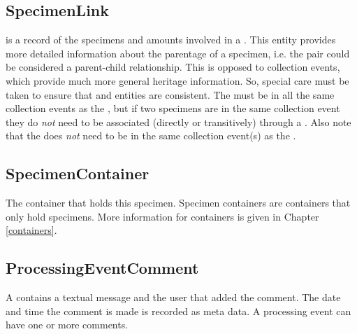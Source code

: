 \subsection*{SpecimenLink}
 is a record of the specimens and amounts involved
in a . This entity provides more detailed
information about the parentage of a specimen, i.e. the 
pair could be considered a parent-child relationship. This is opposed to
collection events, which provide much more general heritage information. So,
special care must be taken to ensure that 
and  entities are consistent. The 
must be in all the same collection events as the , but if two
specimens are in the same collection event they do \emph{not} need to be
associated (directly or transitively) through a . Also
note that the  does \emph{not} need to be in the same
collection event(s) as the .

\subsection*{SpecimenContainer}
The container that holds this specimen. Specimen containers are containers that
only hold specimens. More information for containers is given in Chapter
\ref{containers}.

\subsection*{ProcessingEventComment}
A  contains a textual message and the
user that added the comment. The date and time the comment is made is recorded
as meta data. A processing event can have one or more comments.

